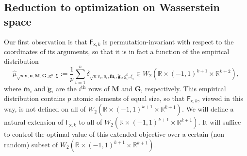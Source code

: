 \documentclass[]{article}
\def\sx{{\mathsf x}}
\def\bv{{\boldsymbol V}}
\def\bM{{\boldsymbol M}}
\def\bu{{\boldsymbol u}}
\def\bg{{\boldsymbol g}}
\def\bv{{\boldsymbol v}}
\def\bxi{{\boldsymbol \xi}}
\def\reals{{\mathbb R}}
\def\bG{{\boldsymbol G}}
\def\bv{{\boldsymbol v}}
\def\bu{{\boldsymbol u}}
\def\bg{{\boldsymbol g}}
\def\muhat{\widehat{\mu}{}}
\def\sF{\mathsf{F}}
\def\brevebm{\breve{\boldsymbol{m}}{}}
\def\brevebg{\breve{\boldsymbol{g}}{}}
\begin{document}
\subsection{Reduction to optimization on Wasserstein space}

Our first observation is that $\sF_{\sx,k}$ is permutation-invariant with respect to the coordinates of its arguments, 
so that it is in fact a function of the empirical distribution
\begin{equation}
    \muhat_{\sqrt{n}\bv,\bu,\bM,\bG,\bg^0,\bxi}
        := 
        \frac1p \sum_{i=1}^n 
        \delta_{\sqrt{n}v_i, u_i, \brevebm_i , \brevebg_i ,g^0_i,\xi_i}
        \in W_2(\reals\times (-1,1)^{k+1} \times \reals^{k+2}),
\end{equation}
where $\brevebm_i$ and $\brevebg_i$ are the $i^\text{th}$ rows of $\bM$ and $\bG$, respectively.
This empirical distribution contains $p$ atomic elements of equal size, 
so that $\sF_{\sx,k}$, viewed in this way, is not defined on all of $W_2(\reals \times (-1,1)^{k+1} \times \reals^{k+1})$.
We will define a natural extension of $\sF_{\sx,k}$ to all of $W_2(\reals \times (-1,1)^{k+1} \times \reals^{k+1})$.
It will suffice to control the optimal value of this extended objective over a certain (non-random) subset of $W_2(\reals \times (-1,1)^{k+1} \times \reals^{k+1})$.
\end{document}
